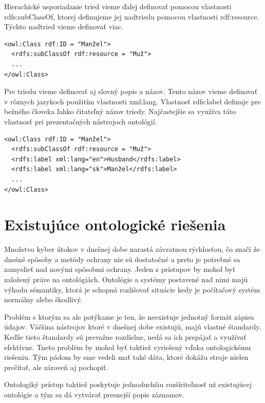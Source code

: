 \documentclass[12pt, a4paper, oneside]{book}
\begin{document}
Hierachické usporiadanie tried vieme ďalej definovať pomocou vlastnosti rdfs:subClassOf, ktorej definujeme jej nadtriedu pomocou vlastnosti rdf:resource. Týchto nadtried vieme definovať viac.
\begin{verbatim}
<owl:Class rdf:ID = "Manžel">
  <rdfs:subClassOf rdf:resource = "Muž">
  ...
</owl:Class>
\end{verbatim}


Pre triedu vieme definovať aj slovný popis a názov. Tento názov vieme definovať v rôznych jazykoch použitím vlastnosti xml:lang. Vlastnosť rdfs:label definuje pre bežného človeka ľahko čitateľný názov triedy. Najčastejšie sa využíva táto vlastnosť pri prezentačných nástrojoch ontológií.


\begin{verbatim}
<owl:Class rdf:ID = "Manžel">
  <rdfs:subClassOf rdf:resource = "Muž">
  <rdfs:label xml:lang="en">Husband</rdfs:label>
  <rdfs:label xml:lang="sk">Manžel</rdfs:label>
  ...
</owl:Class>
\end{verbatim}




\chapter{Existujúce ontologické riešenia}
Množstvo kyber útokov v dnešnej dobe narastá závratnou rýchlosťou, čo značí že dnešné spôsoby a metódy ochrany nie sú dostatočné a preto je potrebné sa zamyslieť nad novými spôsobmi ochrany. Jeden z prístupov by mohol byť založený práve na ontológiách. Ontológie a systémy postavené nad nimi majú výhodu sémantiky, ktorá je schopná rozlišovať situácie kedy je počítačový systém normálny alebo škodlivý.


Problém s ktorým sa ale potýkame je ten, že neexistuje jednotný formát zápisu údajov. Väčšina nástrojov ktoré v dnešnej dobe existujú, majú vlastné štandardy. Keďže tieto štandardy sú prevažne rozdielne, nedá sa ich prepájať a využívať efektívne. Tneto problém by mohol byť taktiež vyriešený vďaka ontologickému riešeniu. Tým pádom by sme vedeli mať také dáta, ktoré dokážu stroje nielen prečítať, ale zároveň aj pochopiť. 
 

Ontologiký prístup taktiež poskytuje jednoduchšiu rozšíriteľnosť už existujúcej ontológie a tým sa dá vytvárať presnejší popis záznamov.
\end{document}
